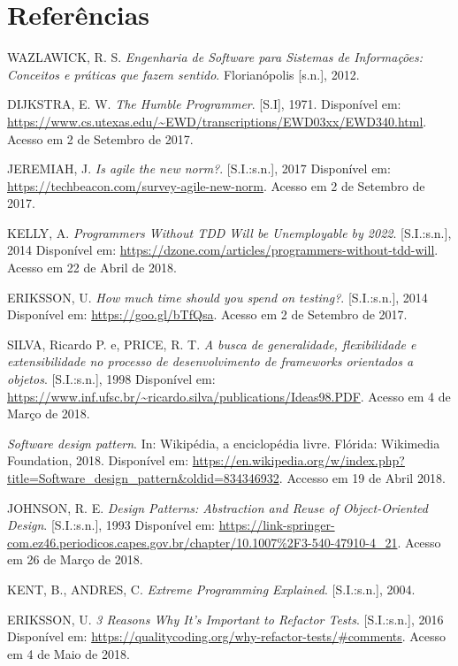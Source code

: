 \documentclass[
    12pt,       %
    openright,      %
    twoside,      %
    a4paper,      %
    english,      %
    french,       %
    spanish,      %
    brazil,       %
    ]{abntex2}
\begin{document}
  \chapter*{Referências}
  \noindent
  WAZLAWICK, R. S. \textit{Engenharia de Software para Sistemas de Informações: Conceitos e práticas que fazem sentido}. Florianópolis [s.n.], 2012.

  \noindent
  DIJKSTRA, E. W. \textit{The Humble Programmer}. [S.I], 1971. Disponível em:
  \url{https://www.cs.utexas.edu/~EWD/transcriptions/EWD03xx/EWD340.html}.
  Acesso em 2 de Setembro de 2017.

  \noindent
  JEREMIAH, J. \textit{Is agile the new norm?}. [S.I.:s.n.], 2017 Disponível em:
  \url{https://techbeacon.com/survey-agile-new-norm}. Acesso em 2 de Setembro de 2017.

  \noindent
  KELLY, A. \textit{Programmers Without TDD Will be Unemployable by 2022}. [S.I.:s.n.],
  2014 Disponível em: \url{https://dzone.com/articles/programmers-without-tdd-will}. Acesso em 22 de Abril de 2018.

  \noindent
  ERIKSSON, U. \textit{How much time should you spend on testing?}. [S.I.:s.n.], 2014 Disponível em:
  \url{https://goo.gl/bTfQsa}. Acesso em 2 de Setembro de 2017.

  \noindent
  SILVA, Ricardo P. e, PRICE, R. T. \textit{A busca de generalidade, flexibilidade e extensibilidade no processo de desenvolvimento de frameworks orientados a objetos}. [S.I.:s.n.], 1998 Disponível em: \url{https://www.inf.ufsc.br/~ricardo.silva/publications/Ideas98.PDF}. Acesso em 4 de Março de 2018.

  \noindent
  \textit{Software design pattern}. In: Wikipédia, a enciclopédia livre. Flórida: Wikimedia Foundation,
  2018. Disponível em:
  \url{https://en.wikipedia.org/w/index.php?title=Software_design_pattern&oldid=834346932}. Accesso
  em 19 de Abril 2018.

  \noindent
  JOHNSON, R. E. \textit{Design Patterns: Abstraction and Reuse of Object-Oriented Design}. [S.I.:s.n.], 1993 Disponível em: \url{https://link-springer-com.ez46.periodicos.capes.gov.br/chapter/10.1007%2F3-540-47910-4_21}. Acesso em 26 de Março de 2018.

  \noindent
  KENT, B., ANDRES, C. \textit{Extreme Programming Explained}. [S.I.:s.n.], 2004.

  \noindent
  ERIKSSON, U. \textit{3 Reasons Why It's Important to Refactor Tests}. [S.I.:s.n.], 2016 Disponível em:
  \url{https://qualitycoding.org/why-refactor-tests/#comments}. Acesso em 4 de Maio de 2018.
\end{document}
